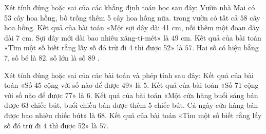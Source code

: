 \begin{ex} %
Xét tính đúng hoặc sai của các khẳng định toán học sau đây:
\choiceTF
{\True Vườn nhà Mai có 53 cây hoa hồng, bố trồng thêm 5 cây hoa hồng nữa. trong vườn có tất cả $58$ cây hoa hồng.}
{Kết quả của bài toán «Một sợi dây dài 41 cm, nối thêm một đoạn dây dài 7 cm. Sợi dây mới dài bao nhiêu xăng-ti-mét» là $49\text{ cm}$.}
{Kết quả của bài toán «Tìm một số biết rằng lấy số đó trừ đi 4 thì được 52» là $57$.}
{\True Hai số có hiệu bằng 7, số bé là 82. số lớn là số $89$ .}
\end{ex}

\begin{ex} %
Xét tính đúng hoặc sai của các bài toán và phép tính sau đây:
\choiceTF
{Kết quả của bài toán «Số 45 cộng với số nào để được 49» là $5$.}
{\True Kết quả của bài toán «Số 71 cộng với số nào để được 77» là $6$.}
{\True Kết quả của bài toán «Một cửa hàng buổi sáng bán được 63 chiếc bút, buổi chiều bán được thêm 5 chiếc bút. Cả ngày cửa hàng bán được bao nhiêu chiếc bút» là $68$.}
{Kết quả của bài toán «Tìm một số biết rằng lấy số đó trừ đi 4 thì được 52» là $57$.}
\end{ex}

